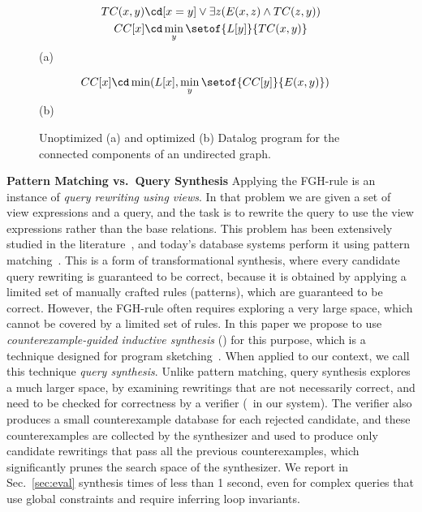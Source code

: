 \begin{figure}
  \centering
\begin{align*}
  TC(x,y) \cd &  [x=y] \vee \exists z(E(x,z) \wedge TC(z,y)) \\
  CC[x] \cd & \min_y \setof{L[y]}{TC(x,y)}
\end{align*}
\null\hfill(a)\hfill\null

\begin{align*}
  CC[x] \cd & \min(L[x], \min_y \setof{CC[y]}{E(x,y)})
\end{align*}
\null\hfill(b)\hfill\null

\caption{Unoptimized (a) and optimized (b) Datalog program for the connected components of an undirected graph.}
  \label{fig:cc}
\end{figure}


{\bf Pattern Matching vs.\ Query Synthesis} Applying the FGH-rule is
an instance of {\em query rewriting using views}.  In that problem we
are given a set of view expressions and a query, and the task is to
rewrite the query to use the view expressions rather than the base
relations. This problem has been extensively studied in the
literature~\cite{DBLP:journals/vldb/Halevy01}, and today's database
systems perform it using pattern
matching~\cite{DBLP:conf/sigmod/GoldsteinL01}.  This is a form of
transformational synthesis, where every candidate query rewriting is
guaranteed to be correct, because it is obtained by applying a limited
set of manually crafted rules (patterns), which are guaranteed to be
correct.  However, the FGH-rule often requires exploring a very large
space, which cannot be covered by a limited set of rules.  In this
paper we propose to use {\em counterexample-guided inductive
  synthesis} (\cegis) for this purpose, which is a technique designed
for program
sketching~\cite{DBLP:conf/asplos/Solar-LezamaTBSS06,DBLP:conf/tacas/TorlakJ07}.
When applied to our context, we call this technique {\em query
  synthesis}.  Unlike pattern matching, query synthesis explores a
much larger space, by examining rewritings that are not necessarily
correct, and need to be checked for correctness by a verifier (\zzz\ in
our system).
The verifier also produces a small counterexample
database for each rejected candidate, and these counterexamples are
collected by the synthesizer and used to produce only candidate
rewritings that pass all the previous counterexamples, which
significantly prunes the search space of the synthesizer.  We report
in Sec.~\ref{sec:eval} synthesis times of less than 1 second, even for
complex queries that use global constraints and require inferring loop
invariants.

